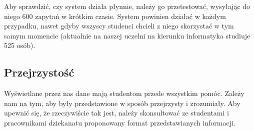 \documentclass{article}
\begin{document}
Aby sprawdzić, czy system działa płynnie, należy go przetestować, wysyłając do niego 600 zapytań w krótkim czasie.
System powinien działać w każdym przypadku, nawet gdyby wszyscy studenci chcieli z niego skorzystać w tym samym momencie (aktualnie na naszej uczelni na kierunku informatyka studiuje 525 osób).

\subsection{Przejrzystość}
Wyświetlane przez nas dane mają studentom przede wszystkim pomóc.
Zależy nam na tym, aby były przedstawione w sposób przejrzysty i zrozumiały.
Aby upewnić się, że rzeczywiście tak jest, należy skonsultować ze studentami i pracownikami dziekanatu proponowany format przedstawianych informacji.
\end{document}
